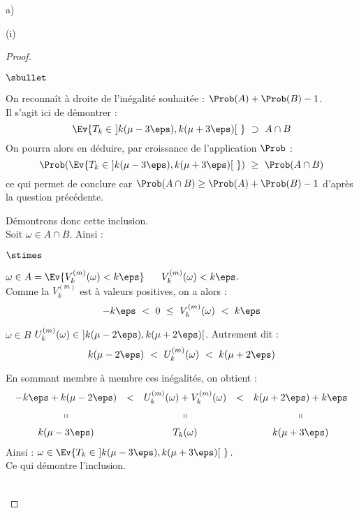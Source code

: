 \documentclass[11pt]{article}%
\begin{document}
\begin{liste}{a)}
\begin{nonoliste}{(i)}
    \begin{proof}~%
      \begin{noliste}{$\sbullet$}
      \item On reconnaît à droite de l'inégalité souhaitée : $\Prob(A)
        + \Prob(B) - 1$.\\
        Il s'agit ici de démontrer : 
        \[
        \Ev{ T_{k} \in \ ]k(\mu - 3 \eps), k(\mu + 3 \eps)[ \ } \
        \supset \ A \cap B
        \]
        On pourra alors en déduire, par croissance de l'application
        $\Prob$ :
        \[
        \Prob(\Ev{ T_{k} \in \ ]k(\mu - 3 \eps), k(\mu + 3 \eps)[ \ })
        \ \geq \ \Prob(A \cap B)
        \]
        ce qui permet de conclure car $\Prob(A \cap B) \geq \Prob(A) +
        \Prob(B) - 1$ d'après la question précédente.

      \item Démontrons donc cette inclusion.\\
        Soit $\omega \in A \cap B$. Ainsi :
        \begin{noliste}{$\stimes$}
        \item $\omega \in A = \Ev{V_{k}^{(m)}(\omega) < k \eps}$ \ \ie
          \ $V_{k}^{(m)}(\omega) < k \eps$.\\
          Comme la \var $V_{k}^{(m)}$ est à valeurs positives, on a
          alors :
          \[
          -k \eps \ < \ 0 \ \leq \ V_{k}^{(m)}(\omega) \ < \ k \eps
          \]

        \item $\omega \in B$ \ie $U_{k}^{(m)}(\omega) \in \ ] k(\mu -
          2 \eps), k(\mu + 2 \eps)[ $. Autrement dit :
          \[
          k(\mu - 2 \eps) \ < \ U_{k}^{(m)}(\omega) \ < \ k(\mu + 2
          \eps)
          \]
        \end{noliste}
        En sommant membre à membre ces inégalités, on obtient :
        \[
        \begin{array}{ccccc}
          - k\eps + k(\mu - 2 \eps) & < & U_{k}^{(m)}(\omega) +
          V_{k}^{(m)}(\omega) & < & k(\mu + 2 \eps) + k\eps
          \\[.2cm]
          \shortparallel & & \shortparallel & & \shortparallel
          \\[.2cm]
          k(\mu - 3 \eps) & & T_k(\omega) & & k(\mu + 3 \eps)
        \end{array}
        \]
        Ainsi : $\omega \in \Ev{T_k \in \ ]k(\mu - 3 \eps), k(\mu + 3
          \eps)[ \ }$.\\
        Ce qui démontre l'inclusion.
      \end{noliste}
      \conc{On a donc bien : $\Prob(\Ev{ T_{k} \in \ ]k(\mu - 3 \eps),
          k(\mu + 3 \eps)[ \ }) \ \geq \ \Prob(A \cap B) \ \geq \
        \Prob(A) + \Prob(B) - 1$.}%
      ~\\[-1.4cm]
    \end{proof}



\end{nonoliste}
\end{liste}
\end{document}
